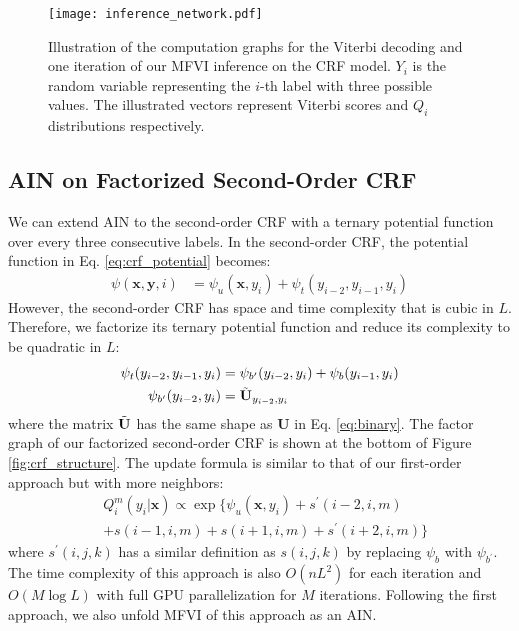 \documentclass[11pt,a4paper]{article}
\newcommand{\xvec}{\mathbf{x}}
\newcommand{\yvec}{\mathbf{y}}
\newcommand{\Uvec}{\mathbf{U}}
\begin{document}
\begin{figure}[t]
\centering
\texttt{[image: inference\_network.pdf]}
\caption{Illustration of the computation graphs for the Viterbi decoding and one iteration of our MFVI inference on the CRF model. $Y_i$ is the random variable representing the $i$-th label with three possible values. The illustrated vectors represent Viterbi scores and $Q_i$ distributions respectively.}
\label{fig:inf_compare}
\end{figure}

\subsection{AIN on Factorized Second-Order CRF}
\label{sec:second-order}

We can extend AIN to the second-order CRF with a ternary potential function over every three consecutive labels. In the second-order CRF, the potential function in Eq. \ref{eq:crf_potential} becomes:
\begin{align}
\psi(\xvec, \yvec, i) &= \psi_u(\xvec, y_i) + \psi_t(y_{i-2}, y_{i-1}, y_{i}) \nonumber \end{align}
However, the second-order CRF has space and time complexity that is cubic in $L$. Therefore, we factorize its ternary potential function and reduce its complexity to be quadratic in $L$:
\begin{align}
\psi_t(y_{i-2}, y_{i-1}, y_{i}) &=\psi_{b^{\prime}}(y_{i-2},y_i) + \psi_b(y_{i-1},y_i) \nonumber \\
\psi_{b^{\prime}}(y_{i-2},y_i) &= \Tilde{\Uvec}_{y_{i-2},y_i}
\nonumber
\end{align}
where the matrix $\Tilde{\Uvec}$ has the same shape as $\Uvec$ in Eq. \ref{eq:binary}. The factor graph of our factorized second-order CRF is shown at the bottom of Figure \ref{fig:crf_structure}. The update formula is similar to that of our first-order approach but with more neighbors:
\begin{align*}
&Q_i^{m}(y_i|\xvec) {\propto} \exp\{\psi_u(\xvec, y_i){+}s^{\prime}(i{-}2,i,m)\\
&{+}s(i{-}1,i,m){+}s(i{+}1,i,m){+}s^{\prime}(i{+}2,i,m)\} 
\end{align*}
where $s^{\prime}(i,j,k)$ has a similar definition as $s(i,j,k)$ by replacing $\psi_b$ with $\psi_{b^{\prime}}$. The time complexity of this approach is also $O(nL^2)$ for each iteration and $O(M \log L)$ with full GPU parallelization for $M$ iterations.
Following the first approach, we also unfold MFVI of this approach as an AIN.
\end{document}
